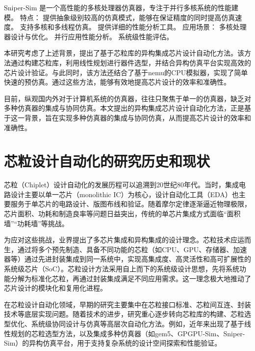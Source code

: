 \documentclass[bachelor]{thesis-uestc}
\begin{document}
Sniper-Sim 是一个高性能的多核处理器仿真器，专注于并行多核系统的性能建模。
特点：
提供抽象级别较高的仿真模式，能够在保证精度的同时提高仿真速度。
支持多核和多线程仿真。
提供详细的性能分析工具。
应用场景：
多核处理器设计与优化。
并行应用性能分析。
系统级性能评估。

本研究考虑了上述背景，提出了基于芯粒库的异构集成芯片设计自动化方法。该方法通过构建芯粒库，利用线性规划进行器件选型，并结合异构仿真平台实现高效的芯片设计验证。与此同时，该方法还结合了基于nemu的CPU模拟器，实现了简单快速的预仿真。通过这些方法，能够有效地提高芯片设计的效率和准确性。

目前，纵观国内外对于计算机系统的仿真器，往往只聚焦于单一的仿真器，缺乏对多种仿真器的集成与协同仿真。本文提出的异构集成芯片设计自动化方法，正是基于这一背景，旨在实现多种仿真器的集成与协同仿真，从而提高芯片设计的效率和准确性。


\section{芯粒设计自动化的研究历史和现状}

芯粒（Chiplet）设计自动化的发展历程可以追溯到20世纪80年代。当时，集成电路设计主要以单一芯片（monolithic IC）为核心，设计自动化工具（EDA）也主要服务于单芯片的电路设计、版图布线和验证。随着摩尔定律逐渐逼近物理极限，芯片面积、功耗和制造良率等问题日益突出，传统的单芯片集成方式面临“面积墙”“功耗墙”等挑战。

为应对这些挑战，业界提出了多芯片集成和异构集成的设计理念。芯粒技术应运而生，通过将多个预先制造、具备不同功能的芯粒（如CPU、GPU、存储器、加速器等）通过先进封装集成到同一系统中，实现高集成度、高灵活性和高可扩展性的系统级芯片（SoC）。芯粒设计方法采用自上而下的系统级设计思想，先将系统功能分解为标准化芯粒，再通过封装集成满足不同应用需求。这一理念极大地推动了芯片设计的模块化和复用化进程。

在芯粒设计自动化领域，早期的研究主要集中在芯粒接口标准、芯粒间互连、封装技术等底层实现问题。随着技术的进步，研究重心逐步转向芯粒库的构建、芯粒选型优化、系统级协同设计与仿真等高层次自动化方法。例如，近年来出现了基于线性规划的芯粒选型方法，以及集成多种仿真器（如gem5、GPGPU-Sim、Sniper-Sim）的异构仿真平台，用于支持复杂系统的设计空间探索和性能验证。
\end{document}
